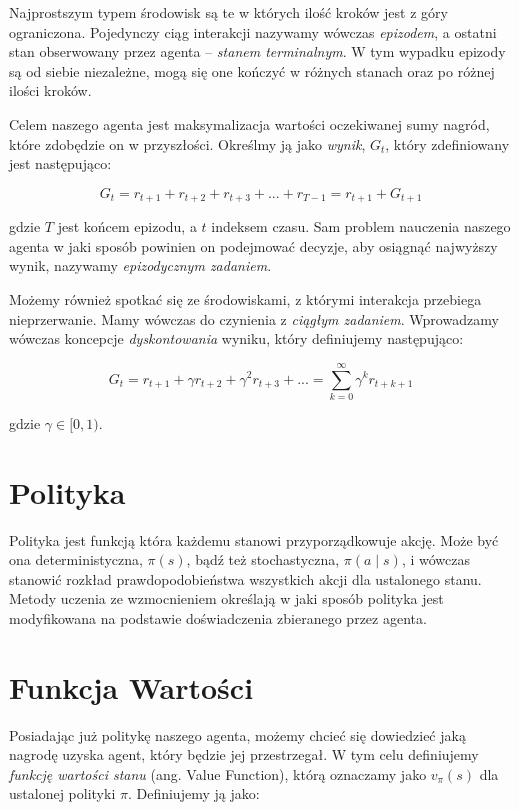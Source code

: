 \documentclass[licencjacka]{pracamgr}
\begin{document}
Najprostszym typem środowisk są te w których ilość kroków jest z góry ograniczona. Pojedynczy ciąg interakcji nazywamy wówczas \emph{epizodem}, a ostatni stan obserwowany przez agenta -- \emph{stanem terminalnym}. W tym wypadku epizody są od siebie niezależne, mogą się one kończyć w różnych stanach oraz po różnej ilości kroków. 

Celem naszego agenta jest maksymalizacja wartości oczekiwanej sumy nagród, które zdobędzie on w przyszłości. Określmy ją jako \emph{wynik}, $ G_t $, który zdefiniowany jest następująco:

$$ G_t = r_{t+1} + r_{t+2} + r_{t+3} + ... + r_{T-1} = r_{t+1} + G_{t+1} $$

gdzie $T$ jest końcem epizodu, a $t$ indeksem czasu. Sam problem nauczenia naszego agenta w jaki sposób powinien on podejmować decyzje, aby osiągnąć najwyższy wynik, nazywamy \emph{epizodycznym zadaniem}.

Możemy również spotkać się ze środowiskami, z którymi interakcja przebiega nieprzerwanie. Mamy wówczas do czynienia z \emph{ciągłym zadaniem}. Wprowadzamy wówczas koncepcje \emph{dyskontowania} wyniku, który definiujemy następująco:

$$ G_t = r_{t+1} + \gamma r_{t+2} + \gamma^2 r_{t+3} + ... = 
\sum_{k=0}^{\infty} \gamma^k r_{t+k+1} $$

gdzie $ \gamma \in [0, 1) $.


\section{Polityka}

Polityka jest funkcją która każdemu stanowi przyporządkowuje akcję. Może być ona deterministyczna, $ \pi(s) $, bądź też stochastyczna, $ \pi(a \mid s) $, i wówczas stanowić rozkład prawdopodobieństwa wszystkich akcji dla ustalonego stanu. Metody uczenia ze wzmocnieniem określają w jaki sposób polityka jest modyfikowana na podstawie doświadczenia zbieranego przez agenta.

\section{Funkcja Wartości}

Posiadając już politykę naszego agenta, możemy chcieć się dowiedzieć jaką nagrodę uzyska agent, który będzie jej przestrzegał. W tym celu definiujemy \emph{funkcję wartości stanu} (ang. Value Function), którą oznaczamy jako $ v_{\pi}(s) $ dla ustalonej polityki $ \pi $. Definiujemy ją jako:
\end{document}
